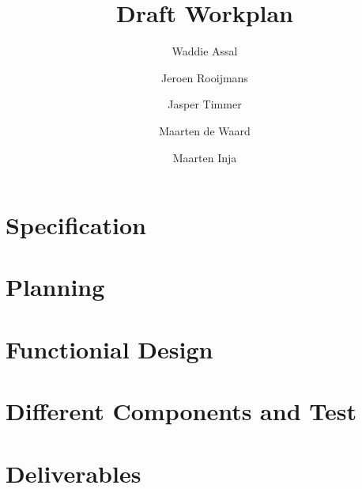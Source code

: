 \documentclass[a4paper, notitlepage]{article}
\title{Draft Workplan}
\author{Waddie Assal \and Jeroen Rooijmans \and Jasper Timmer \and Maarten de Waard \and Maarten Inja}
\begin{document}
\maketitle

\section{Specification}

\section{Planning}


\section{Functionial Design}

\section{Different Components and Test}

\section{Deliverables}
\end{document}

